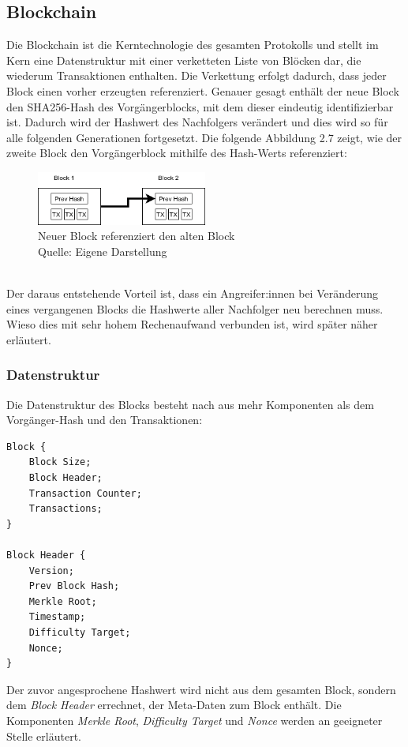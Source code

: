 \subsection{Blockchain}
Die Blockchain ist die Kerntechnologie des gesamten Protokolls und stellt im Kern eine Datenstruktur mit einer verketteten Liste von Blöcken dar, die wiederum Transaktionen enthalten. 
Die Verkettung erfolgt dadurch, dass jeder Block einen vorher erzeugten referenziert. 
Genauer gesagt enthält der neue Block den SHA256-Hash des Vorgängerblocks, mit dem dieser eindeutig identifizierbar ist. Dadurch wird der Hashwert des Nachfolgers verändert und dies wird so für alle folgenden Generationen fortgesetzt. Die folgende Abbildung 2.7 zeigt, wie der zweite Block den Vorgängerblock mithilfe des Hash-Werts referenziert:
\begin{figure}[htpb]
	\centering
	\includegraphics[width=0.5\textwidth]{images/chain.png}
	\caption{Neuer Block referenziert den alten Block \\
	Quelle: Eigene Darstellung}
	\label{6braun:fig:chain}
\end{figure}\\

Der daraus entstehende Vorteil ist, dass ein Angreifer:innen bei Veränderung eines vergangenen Blocks die Hashwerte aller Nachfolger neu berechnen muss. Wieso dies mit sehr hohem Rechenaufwand verbunden ist, wird später näher erläutert.
\\
\subsubsection{Datenstruktur}
Die Datenstruktur des Blocks besteht nach \cite[S. 194/195]{antanopoulos_2014} aus mehr Komponenten als dem Vorgänger-Hash und den Transaktionen:
\begin{lstlisting}[mathescape, caption={Datenstruktur des Blocks},captionpos=b]
Block {
	Block Size;
	Block Header;
	Transaction Counter;
	Transactions;
}

Block Header {
	Version;
	Prev Block Hash;
	Merkle Root;
	Timestamp;
	Difficulty Target;
	Nonce;
}
\end{lstlisting}
Der zuvor angesprochene Hashwert wird nicht aus dem gesamten Block, sondern dem \emph{Block Header} errechnet, der Meta-Daten zum Block enthält. Die Komponenten \emph{Merkle Root}, \emph{Difficulty Target} und \emph{Nonce} werden an geeigneter Stelle erläutert.\\

